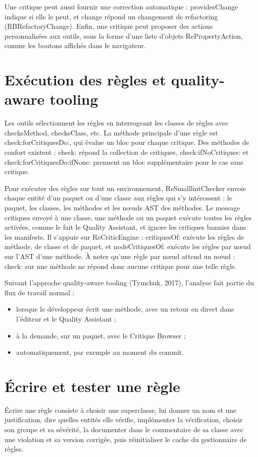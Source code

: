 \documentclass[11pt,a4paper]{report}
\begin{document}
Une critique peut aussi fournir une correction automatique : providesChange indique si elle le peut, et change répond un changement de refactoring (RBRefactoryChange). Enfin, une critique peut proposer des actions personnalisées aux outils, sous la forme d’une liste d’objets RePropertyAction, comme les boutons affichés dans le navigateur.

\section{Exécution des règles et quality-aware tooling}
Les outils sélectionnent les règles en interrogeant les classes de règles avec checksMethod, checksClass, etc. La méthode principale d’une règle est check:forCritiquesDo:, qui évalue un bloc pour chaque critique. Des méthodes de confort existent : check: répond la collection de critiques, check:ifNoCritiques: et check:forCritiquesDo:ifNone: prennent un bloc supplémentaire pour le cas sans critique.

Pour exécuter des règles sur tout un environnement, ReSmalllintChecker envoie chaque entité d’un paquet ou d’une classe aux règles qui s’y intéressent : le paquet, les classes, les méthodes et les nœuds AST des méthodes. Le message critiques envoyé à une classe, une méthode ou un paquet exécute toutes les règles activées, comme le fait le Quality Assistant, et ignore les critiques bannies dans les manifests. Il s’appuie sur ReCriticEngine : critiquesOf: exécute les règles de méthode, de classe et de paquet, et nodeCritiquesOf: exécute les règles par nœud sur l’AST d’une méthode. À noter qu’une règle par nœud attend un nœud : check: sur une méthode ne répond donc aucune critique pour une telle règle.

Suivant l’approche quality-aware tooling (Tymchuk, 2017), l’analyse fait partie du flux de travail normal :

\begin{itemize}
  \item lorsque le développeur écrit une méthode, avec un retour en direct dans l’éditeur et le Quality Assistant ;
  \item à la demande, sur un paquet, avec le Critique Browser ;
  \item automatiquement, par exemple au moment du commit.
\end{itemize}

\section{Écrire et tester une règle}
Écrire une règle consiste à choisir une superclasse, lui donner un nom et une justification, dire quelles entités elle vérifie, implémenter la vérification, choisir son groupe et sa sévérité, la documenter dans le commentaire de sa classe avec une violation et sa version corrigée, puis réinitialiser le cache du gestionnaire de règles.
\end{document}
